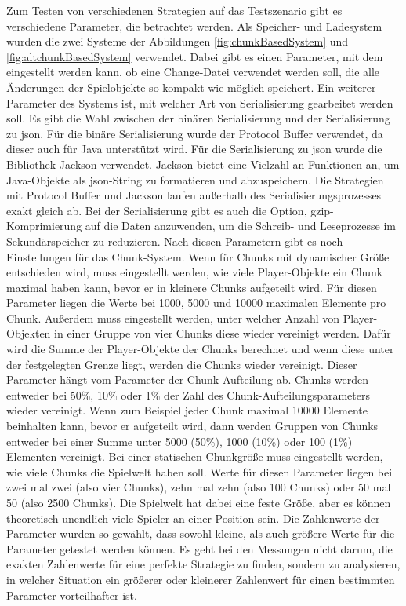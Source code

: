 Zum Testen von verschiedenen Strategien auf das Testszenario gibt es verschiedene Parameter, die betrachtet werden. Als Speicher- und Ladesystem wurden die zwei Systeme der Abbildungen \ref{fig:chunkBasedSystem} und \ref{fig:altchunkBasedSystem} verwendet. Dabei gibt es einen Parameter, mit dem eingestellt werden kann, ob eine Change-Datei verwendet werden soll, die alle Änderungen der Spielobjekte so kompakt wie möglich speichert. Ein weiterer Parameter des Systems ist, mit welcher Art von Serialisierung gearbeitet werden soll. Es gibt die Wahl zwischen der binären Serialisierung und der Serialisierung zu \ac{json}. Für die binäre Serialisierung wurde der Protocol Buffer verwendet, da dieser auch für Java unterstützt wird. Für die Serialisierung zu \ac{json} wurde die Bibliothek Jackson verwendet. Jackson bietet eine Vielzahl an Funktionen an, um Java-Objekte als \ac{json}-String zu formatieren und abzuspeichern.\cite{githubGitHubFasterXMLjackson} Die Strategien mit Protocol Buffer und Jackson laufen außerhalb des Serialisierungsprozesses exakt gleich ab. Bei der Serialisierung gibt es auch die Option, \ac{gzip}-Komprimierung auf die Daten anzuwenden, um die Schreib- und Leseprozesse im Sekundärspeicher zu reduzieren. Nach diesen Parametern gibt es noch Einstellungen für das Chunk-System. Wenn für Chunks mit dynamischer Größe entschieden wird, muss eingestellt werden, wie viele Player-Objekte ein Chunk maximal haben kann, bevor er in kleinere Chunks aufgeteilt wird. Für diesen Parameter liegen die Werte bei 1000, 5000 und 10000 maximalen Elemente pro Chunk. Außerdem muss eingestellt werden, unter welcher Anzahl von Player-Objekten in einer Gruppe von vier Chunks diese wieder vereinigt werden. Dafür wird die Summe der Player-Objekte der Chunks berechnet und wenn diese unter der festgelegten Grenze liegt, werden die Chunks wieder vereinigt. Dieser Parameter hängt vom Parameter der Chunk-Aufteilung ab. Chunks werden entweder bei 50\%, 10\% oder 1\% der Zahl des Chunk-Aufteilungsparameters wieder vereinigt. Wenn zum Beispiel jeder Chunk maximal 10000 Elemente beinhalten kann, bevor er aufgeteilt wird, dann werden Gruppen von Chunks entweder bei einer Summe unter 5000 (50\%), 1000 (10\%) oder 100 (1\%) Elementen vereinigt. Bei einer statischen Chunkgröße muss eingestellt werden, wie viele Chunks die Spielwelt haben soll. Werte für diesen Parameter liegen bei zwei mal zwei (also vier Chunks), zehn mal zehn (also 100 Chunks) oder 50 mal 50 (also 2500 Chunks). Die Spielwelt hat dabei eine feste Größe, aber es können theoretisch unendlich viele Spieler an einer Position sein. Die Zahlenwerte der Parameter wurden so gewählt, dass sowohl kleine, als auch größere Werte für die Parameter getestet werden können. Es geht bei den Messungen nicht darum, die exakten Zahlenwerte für eine perfekte Strategie zu finden, sondern zu analysieren, in welcher Situation ein größerer oder kleinerer Zahlenwert für einen bestimmten Parameter vorteilhafter ist. 

